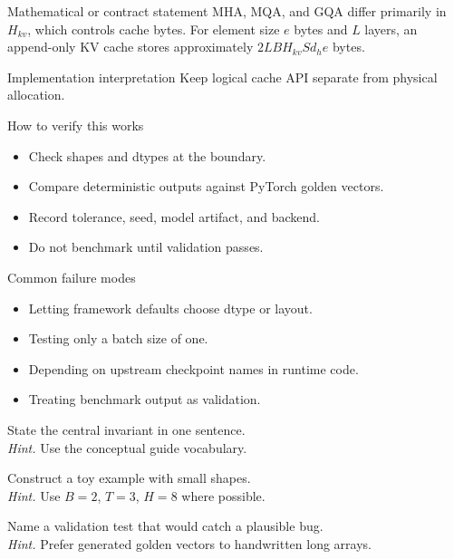 \begin{definitionbox}{Mathematical or contract statement}
MHA, MQA, and GQA differ primarily in \(H_{kv}\), which controls cache bytes. For element size \(e\) bytes and \(L\) layers, an append-only KV cache stores approximately \(2LBH_{kv}Sd_h e\) bytes.
\end{definitionbox}

\begin{implementationbox}{Implementation interpretation}
Keep logical cache API separate from physical allocation.
\end{implementationbox}

\begin{verificationbox}{How to verify this works}
\begin{itemize}
\item Check shapes and dtypes at the boundary.
\item Compare deterministic outputs against PyTorch golden vectors.
\item Record tolerance, seed, model artifact, and backend.
\item Do not benchmark until validation passes.
\end{itemize}
\end{verificationbox}

\begin{warningbox}{Common failure modes}
\begin{itemize}
\item Letting framework defaults choose dtype or layout.
\item Testing only a batch size of one.
\item Depending on upstream checkpoint names in runtime code.
\item Treating benchmark output as validation.
\end{itemize}
\end{warningbox}

\begin{chapterexercises}
\item State the central invariant in one sentence.\\
\textit{Hint.} Use the conceptual guide vocabulary.
\item Construct a toy example with small shapes.\\
\textit{Hint.} Use $B=2$, $T=3$, $H=8$ where possible.
\item Name a validation test that would catch a plausible bug.\\
\textit{Hint.} Prefer generated golden vectors to handwritten long arrays.
\end{chapterexercises}

